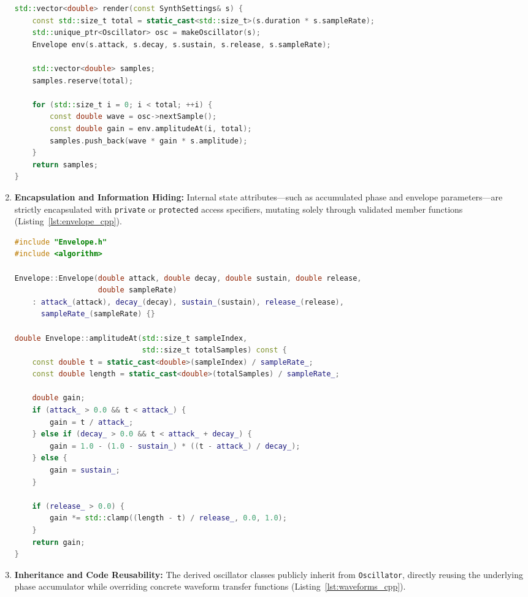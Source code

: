 \documentclass[12pt,a4paper,oneside]{book}
\begin{document}
\begin{enumerate}
\begin{lstlisting}[language=C++, caption={Polymorphic Factory and Rendering Pipeline (\texttt{src/Synth.cpp})}, label={lst:synth_cpp}]
std::vector<double> render(const SynthSettings& s) {
    const std::size_t total = static_cast<std::size_t>(s.duration * s.sampleRate);
    std::unique_ptr<Oscillator> osc = makeOscillator(s);
    Envelope env(s.attack, s.decay, s.sustain, s.release, s.sampleRate);

    std::vector<double> samples;
    samples.reserve(total);

    for (std::size_t i = 0; i < total; ++i) {
        const double wave = osc->nextSample();
        const double gain = env.amplitudeAt(i, total);
        samples.push_back(wave * gain * s.amplitude);
    }
    return samples;
}
\end{lstlisting}

    \item \textbf{Encapsulation and Information Hiding:} 
    Internal state attributes—such as accumulated phase and envelope parameters—are strictly encapsulated with \texttt{private} or \texttt{protected} access specifiers, mutating solely through validated member functions (Listing~\ref{lst:envelope_cpp}).

\begin{lstlisting}[language=C++, caption={Encapsulated ADSR Dynamic Envelope Modulator (\texttt{src/Envelope.cpp})}, label={lst:envelope_cpp}]
#include "Envelope.h"
#include <algorithm>

Envelope::Envelope(double attack, double decay, double sustain, double release,
                   double sampleRate)
    : attack_(attack), decay_(decay), sustain_(sustain), release_(release),
      sampleRate_(sampleRate) {}

double Envelope::amplitudeAt(std::size_t sampleIndex,
                             std::size_t totalSamples) const {
    const double t = static_cast<double>(sampleIndex) / sampleRate_;
    const double length = static_cast<double>(totalSamples) / sampleRate_;

    double gain;
    if (attack_ > 0.0 && t < attack_) {
        gain = t / attack_;
    } else if (decay_ > 0.0 && t < attack_ + decay_) {
        gain = 1.0 - (1.0 - sustain_) * ((t - attack_) / decay_);
    } else {
        gain = sustain_;
    }

    if (release_ > 0.0) {
        gain *= std::clamp((length - t) / release_, 0.0, 1.0);
    }
    return gain;
}
\end{lstlisting}

    \item \textbf{Inheritance and Code Reusability:} 
    The derived oscillator classes publicly inherit from \texttt{Oscillator}, directly reusing the underlying phase accumulator while overriding concrete waveform transfer functions (Listing~\ref{lst:waveforms_cpp}).


\end{enumerate}
\end{document}
